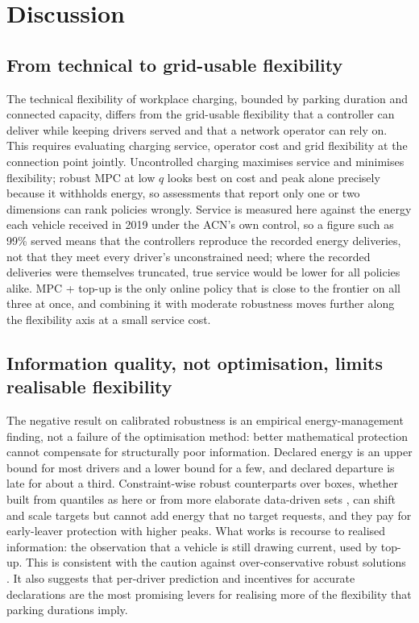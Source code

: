 \section{Discussion}\label{sec:discussion}
\subsection{From technical to grid-usable flexibility}
The technical flexibility of workplace charging, bounded by parking duration and connected capacity, differs from the grid-usable flexibility that a controller can deliver while keeping drivers served and that a network operator can rely on. This requires evaluating charging service, operator cost and grid flexibility at the connection point jointly. Uncontrolled charging maximises service and minimises flexibility; robust MPC at low $q$ looks best on cost and peak alone precisely because it withholds energy, so assessments that report only one or two dimensions can rank policies wrongly. Service is measured here against the energy each vehicle received in 2019 under the ACN's own control, so a figure such as 99\% served means that the controllers reproduce the recorded energy deliveries, not that they meet every driver's unconstrained need; where the recorded deliveries were themselves truncated, true service would be lower for all policies alike. MPC + top-up is the only online policy that is close to the frontier on all three at once, and combining it with moderate robustness moves further along the flexibility axis at a small service cost.

\subsection{Information quality, not optimisation, limits realisable flexibility}
The negative result on calibrated robustness is an empirical energy-management finding, not a failure of the optimisation method: better mathematical protection cannot compensate for structurally poor information. Declared energy is an upper bound for most drivers and a lower bound for a few, and declared departure is late for about a third. Constraint-wise robust counterparts over boxes, whether built from quantiles as here or from more elaborate data-driven sets \cite{Bertsimas2018DataDriven,Esfahani2018Wasserstein}, can shift and scale targets but cannot add energy that no target requests, and they pay for early-leaver protection with higher peaks. What works is recourse to realised information: the observation that a vehicle is still drawing current, used by top-up. This is consistent with the caution against over-conservative robust solutions \cite{Bertsimas2004Price,Gorissen2015Guide}. It also suggests that per-driver prediction \cite{Lee2019ACNData,Wang2016Predictive,Kreft2024Predictability} and incentives for accurate declarations are the most promising levers for realising more of the flexibility that parking durations imply.

